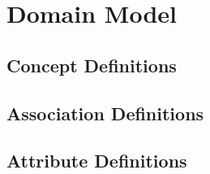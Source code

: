 \chapter{Domain Model}


\section{Concept Definitions}


\section{Association Definitions}


\section{Attribute Definitions}



